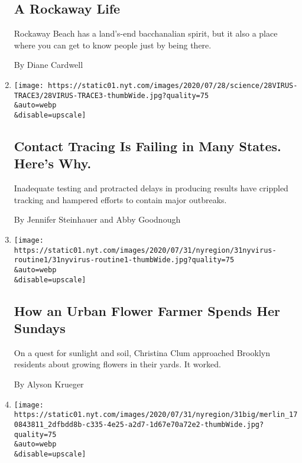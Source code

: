 \begin{enumerate}
  \hypertarget{a-rockaway-life}{%
  \subsection{A Rockaway Life}\label{a-rockaway-life}}

  Rockaway Beach has a land's-end bacchanalian spirit, but it also a
  place where you can get to know people just by being there.

  By Diane Cardwell
\item
  \href{/2020/07/31/health/covid-contact-tracing-tests.html}{}

  \texttt{[image: https://static01.nyt.com/images/2020/07/28/science/28VIRUS-TRACE3/28VIRUS-TRACE3-thumbWide.jpg?quality=75\\\&auto=webp\\\&disable=upscale]}

  \hypertarget{contact-tracing-is-failing-in-many-states-heres-why}{%
  \subsection{Contact Tracing Is Failing in Many States. Here's
  Why.}\label{contact-tracing-is-failing-in-many-states-heres-why}}

  Inadequate testing and protracted delays in producing results have
  crippled tracking and hampered efforts to contain major outbreaks.

  By Jennifer Steinhauer and Abby Goodnough
\item
  \href{/2020/07/31/nyregion/urban-gardening-nyc.html}{}

  \texttt{[image: https://static01.nyt.com/images/2020/07/31/nyregion/31nyvirus-routine1/31nyvirus-routine1-thumbWide.jpg?quality=75\\\&auto=webp\\\&disable=upscale]}

  \hypertarget{how-an-urban-flower-farmer-spends-her-sundays}{%
  \subsection{How an Urban Flower Farmer Spends Her
  Sundays}\label{how-an-urban-flower-farmer-spends-her-sundays}}

  On a quest for sunlight and soil, Christina Clum approached Brooklyn
  residents about growing flowers in their yards. It worked.

  By Alyson Krueger
\item
  \href{/2020/07/31/nyregion/ny-parole-violations.html}{}

  \texttt{[image: https://static01.nyt.com/images/2020/07/31/nyregion/31big/merlin\_170843811\_2dfbdd8b-c335-4e25-a2d7-1d67e70a72e2-thumbWide.jpg?quality=75\\\&auto=webp\\\&disable=upscale]}


\end{enumerate}
